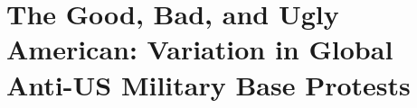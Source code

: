 \chapter{The Good, Bad, and Ugly American: Variation in Global Anti-US Military Base Protests \label{cha:protest}}

\doublespacing







